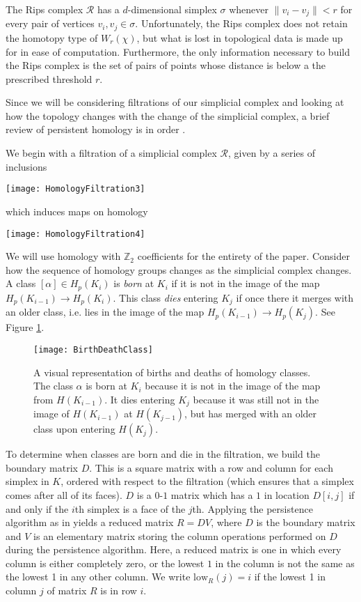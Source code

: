 \documentclass[10pt,twocolumn]{article} \usepackage{amsmath,epsf,amssymb,cite,pifont,amsthm, mathrsfs,epsfig,  bbm, amsthm,  setspace}
\newcommand{\RR}{\mathcal R}
\newcommand{\Z}{\mathbb Z}
\renewcommand{\1}{\mathbbm{1}}
\newcommand{\low}{\textrm{low}}
\newcommand{\norm}[1]{\| #1 \|}
\begin{document}
The Rips complex $\RR$  has a $d$-dimensional simplex $\sigma$
whenever $\norm{v_i-v_j}<r$ for every pair of vertices $v_i,v_j \in \sigma$.
Unfortunately, the Rips complex does not retain the homotopy type of $W_r(\chi)$,
but what is lost in topological data is made up for in ease of computation.
Furthermore, the only  information necessary
to build the Rips complex is the set of pairs of points whose distance is below a the prescribed threshold $r$.


Since we will be considering filtrations of our simplicial complex and looking at how the topology
changes with the change of the simplicial complex, a brief review of persistent homology is in order \cite{Edelsbrunner2010}.

We begin with a filtration of a simplicial complex $\RR$, given by a series of inclusions
\begin{center}
 \texttt{[image: HomologyFiltration3]}
\end{center}
which induces maps on homology

\begin{center}
 \texttt{[image: HomologyFiltration4]}
\end{center}
We will use homology with $\Z_2$ coefficients for the entirety of the paper.
Consider how the sequence of homology groups changes as the simplicial complex changes.
A class $[\alpha] \in H_p(K_i)$ is {\em born} at $K_i$ if it is not in the image of the map
$H_p(K_{i-1}) \to H_p(K_i)$.
This class {\em dies} entering $K_j$ if once there it merges with an older class,
i.e. lies in the image of the map $H_p(K_{i-1}) \to H_p(K_j)$.
See Figure \ref{F:BirthDeathClass}.


\begin{figure}
 \begin{center}
\texttt{[image: BirthDeathClass]}
 \end{center}
 \caption{A visual representation of births and deaths of homology classes.
 The class $\alpha$ is born at $K_i$ because it is not in the image of the map from $H(K_{i-1})$.
 It dies entering $K_j$ because it was still not in the image of $H(K_{i-1})$ at $H(K_{j-1})$,
 but has merged with an older class upon entering $H(K_j)$.}
\label{F:BirthDeathClass}
\end{figure}

To determine when classes are born and die in the filtration, we build the boundary matrix $D$.
This is a square matrix with a row and column for each simplex in $K$,
ordered with respect to the filtration (which  ensures that a simplex comes after all of its faces).
$D$ is a $0$-$1$ matrix which has a $1$ in location $D[i,j]$ if and only if the $i$th simplex is a
face of the $j$th.
Applying the persistence algorithm as in \cite{Edelsbrunner2010} yields a reduced matrix $R=DV$,
where $D$ is the boundary matrix and $V$ is an elementary matrix storing the column operations
performed on $D$ during the persistence algorithm.
Here, a reduced matrix is one in which every column is either completely zero, or the lowest $1$
in the column is not the same as the lowest 1 in any other column.
We write $\low_R(j)=i$ if the lowest 1 in column $j$ of matrix $R$ is in row $i$.
\end{document}
